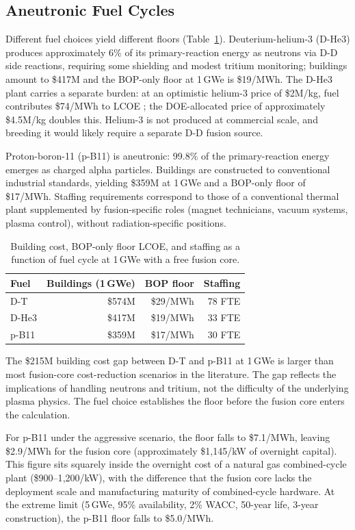 \documentclass{article}
\begin{document}
\subsection{Aneutronic Fuel Cycles}
\label{sec:aneutronic}

Different fuel choices yield different floors
(Table~\ref{tab:fuels}). Deuterium-helium-3 (D-He3) produces
approximately 6\% of its primary-reaction energy as neutrons via
D-D side reactions, requiring some shielding and modest tritium
monitoring; buildings amount to \$417M and the BOP-only floor at
1\,GWe is \$19/MWh. The D-He3 plant carries a separate burden:
at an optimistic helium-3 price of \$2M/kg, fuel contributes
\$74/MWh to LCOE \citep{Shea2010}; the DOE-allocated price of
approximately \$4.5M/kg doubles this. Helium-3 is not
produced at commercial scale, and breeding it would likely require
a separate D-D fusion source.

Proton-boron-11 (p-B11) is aneutronic: 99.8\% of the
primary-reaction energy emerges as charged alpha particles.
Buildings are constructed to conventional industrial standards,
yielding \$359M at 1\,GWe and a BOP-only floor of \$17/MWh.
Staffing requirements correspond to those of a conventional thermal
plant supplemented by fusion-specific roles (magnet technicians,
vacuum systems, plasma control), without radiation-specific
positions.

\begin{table}[htbp]
\caption{Building cost, BOP-only floor LCOE, and staffing as a
function of fuel cycle at 1\,GWe with a free fusion core.}
\label{tab:fuels}
\centering
\begin{tabular}{lrrr}
\toprule
Fuel & Buildings (1\,GWe) & BOP floor & Staffing \\
\midrule
D-T & \$574M & \$29/MWh & 78 FTE \\
D-He3 & \$417M & \$19/MWh & 33 FTE \\
p-B11 & \$359M & \$17/MWh & 30 FTE \\
\bottomrule
\end{tabular}
\end{table}

The \$215M building cost gap between D-T and p-B11 at 1\,GWe is
larger than most fusion-core cost-reduction scenarios in the
literature. The gap reflects the implications of handling neutrons
and tritium, not the difficulty of the underlying plasma physics.
The fuel choice establishes the floor before the fusion core enters
the calculation.

For p-B11 under the aggressive scenario, the floor falls to
\$7.1/MWh, leaving \$2.9/MWh for the fusion core (approximately
\$1{,}145/kW of overnight capital). This figure sits squarely
inside the overnight cost of a natural gas combined-cycle plant
(\$900--1{,}200/kW), with the difference that the fusion core
lacks the deployment scale and manufacturing maturity of
combined-cycle hardware. At the extreme limit (5\,GWe, 95\%
availability, 2\% WACC, 50-year life, 3-year construction), the
p-B11 floor falls to \$5.0/MWh.
\end{document}
